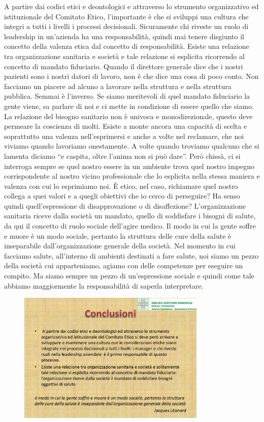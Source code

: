 A partire dai codici etici e deontologici e attraverso lo strumento
organizzativo ed istituzionale del Comitato Etico, l'importante è che si
sviluppi una cultura che integri a tutti i livelli i processi
decisionali. Sicuramente chi riveste un ruolo di leadership in
un'azienda ha una responsabilità, quindi mai tenere disgiunto il
concetto della valenza etica dal concetto di responsabilità. Esiste una
relazione tra organizzazione sanitaria e società e tale relazione si
esplicita ricorrendo al concetto di mandato fiduciario. Quando il
direttore generale dice che i nostri pazienti sono i nostri datori di
lavoro, non è che dice una cosa di poco conto. Non facciamo un piacere
ad alcuno a lavorare nella struttura e nella struttura pubblica. Semmai
è l'inverso. Se siamo meritevoli di quel mandato fiduciario la gente
viene, sa parlare di noi e ci mette in condizione di essere quello che
siamo. La relazione del bisogno sanitario non è univoca e
monodirezionale, questo deve permeare la coscienza di molti. Esiste a
monte ancora una capacità di scelta e soprattutto una valenza
nell'esprimersi e anche a volte nel reclamare, che noi viviamo quando
lavoriamo onestamente. A volte quando troviamo qualcuno che si lamenta
diciamo ``e caspita, oltre l'anima non si può dare''. Però chissà, ci si
interroga sempre se quel nostro essere in un ambiente trova quel nostro
impegno corrispondente al nostro vicino professionale che lo esplicita
nella stessa maniera e valenza con cui lo esprimiamo noi. È etico, nel
caso, richiamare quel nostro collega a quei valori e a quegli obiettivi
che io cerco di perseguire? Ha senso quindi quell'espressione di
disapprovazione o di disaffezione? L'organizzazione sanitaria riceve
dalla società un mandato, quello di soddisfare i bisogni di salute, da
qui il concetto di ruolo sociale dell'agire medico. Il modo in cui la
gente soffre e muore è un modo sociale, pertanto la struttura delle cure
della salute è inseparabile dall'organizzazione generale della società.
Nel momento in cui facciamo salute, all'interno di ambienti destinati a
fare salute, noi siamo un pezzo della società cui apparteniamo, agiamo
con delle competenze per eseguire un compito. Ma siamo sempre un pezzo
di un'espressione sociale e quindi come tale abbiamo maggiormente la
responsabilità di saperla interpretare.

 \begin{figure}[!ht]
\centering
	\includegraphics[width=0.8\textwidth]{32/image27.jpeg}
	\end{figure}


